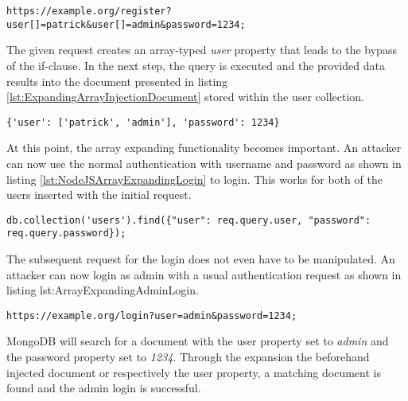 \begin{lstlisting}[caption={Attack vector against MongoDB for expanding array injection via the query-string parameter}, label={lst:ExpandingArrayInjection}]
https://example.org/register?user[]=patrick&user[]=admin&password=1234;
\end{lstlisting}

The given request creates an array-typed \emph{user} property that leads to the bypass of the if-clause. In the next step, the query is executed and the provided data results into the document presented in listing \ref{lst:ExpandingArrayInjectionDocument} stored within the user collection.\\

\begin{lstlisting}[caption={Resulting parameter for expanding array injection}, label={lst:ExpandingArrayInjectionDocument}]
{'user': ['patrick', 'admin'], 'password': 1234}
\end{lstlisting}

At this point, the array expanding functionality becomes important. An attacker can now use the normal authentication with username and password as shown in listing \ref{lst:NodeJSArrayExpandingLogin} to login. This works for both of the users inserted with the initial request. \\

\begin{lstlisting}[caption={Login example affected by the preceding expanding array injection}, label={lst:NodeJSArrayExpandingLogin}]
db.collection('users').find({"user": req.query.user, "password": req.query.password});
\end{lstlisting}

The subsequent request for the login does not even have to be manipulated. An attacker can now login as admin with a usual authentication request as shown in listing {lst:ArrayExpandingAdminLogin}.\\

\begin{lstlisting}[caption={Usual login request exploiting the injected user array}, label={lst:ArrayExpandingAdminLogin}]
https://example.org/login?user=admin&password=1234;
\end{lstlisting}

MongoDB will search for a document with the user property set to \emph{admin} and the password property set to \emph{1234}. Through the expansion the beforehand injected document or respectively the user property, a matching document is found and the admin login is successful.\\

